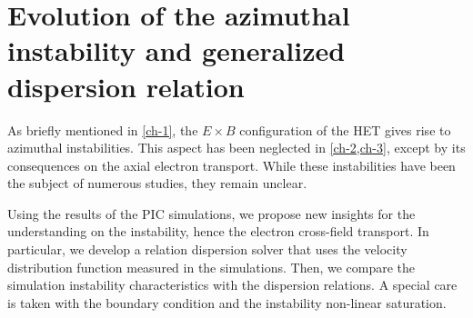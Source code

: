 



\chapter{Evolution of the azimuthal instability and generalized dispersion relation}
\label{ch-5}

\begin{Chabstract}
  
As briefly mentioned in \cref{ch-1}, the $E \times B$ configuration of the \ac{HET} gives rise to azimuthal instabilities.
This aspect has been neglected in \cref{ch-2,ch-3}, except by its consequences on the axial electron transport.
While these instabilities have been the subject of numerous studies, they remain unclear.

Using the results of the \ac{PIC} simulations, we propose new insights for the understanding on the instability, hence the electron cross-field transport.
In particular, we develop a relation dispersion solver that uses the velocity distribution function measured in the simulations.
Then, we compare the simulation instability characteristics with the dispersion relations.
A special care is taken with the boundary condition and the instability non-linear saturation. 
\end{Chabstract}

% 
% 

\minitoc








